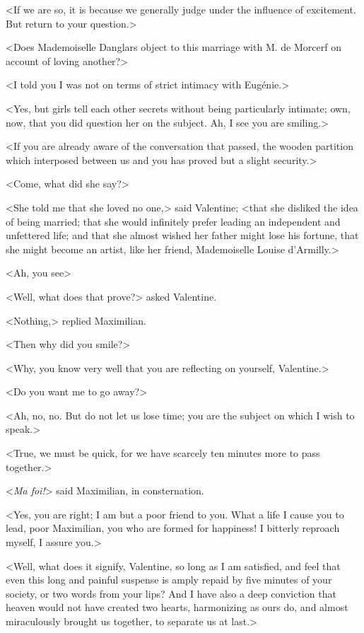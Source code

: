  <If we are so, it is because we generally judge under the influence of excitement. But return to your question.>

<Does Mademoiselle Danglars object to this marriage with M. de Morcerf on account of loving another?> 

 <I told you I was not on terms of strict intimacy with Eugénie.> 

 <Yes, but girls tell each other secrets without being particularly intimate; own, now, that you did question her on the subject. Ah, I see you are smiling.> 

 <If you are already aware of the conversation that passed, the wooden partition which interposed between us and you has proved but a slight security.> 

 <Come, what did she say?> 

 <She told me that she loved no one,> said Valentine; <that she disliked the idea of being married; that she would infinitely prefer leading an independent and unfettered life; and that she almost wished her father might lose his fortune, that she might become an artist, like her friend, Mademoiselle Louise d'Armilly.> 

 <Ah, you see\longdash> 

 <Well, what does that prove?> asked Valentine. 

 <Nothing,> replied Maximilian. 

 <Then why did you smile?> 

 <Why, you know very well that you are reflecting on yourself, Valentine.> 

 <Do you want me to go away?> 

 <Ah, no, no. But do not let us lose time; you are the subject on which I wish to speak.> 

 <True, we must be quick, for we have scarcely ten minutes more to pass together.> 

 <\textit{Ma foi!}> said Maximilian, in consternation. 

 <Yes, you are right; I am but a poor friend to you. What a life I cause you to lead, poor Maximilian, you who are formed for happiness! I bitterly reproach myself, I assure you.> 

 <Well, what does it signify, Valentine, so long as I am satisfied, and feel that even this long and painful suspense is amply repaid by five minutes of your society, or two words from your lips? And I have also a deep conviction that heaven would not have created two hearts, harmonizing as ours do, and almost miraculously brought us together, to separate us at last.> 

